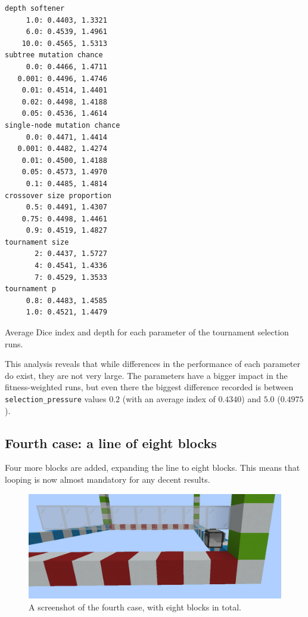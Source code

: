 \documentclass{report}
\newenvironment{code}{\captionsetup{type=listing}}{}
\begin{document}
\begin{code}
    \begin{verbatim}
depth softener
     1.0: 0.4403, 1.3321
     6.0: 0.4539, 1.4961
    10.0: 0.4565, 1.5313
subtree mutation chance
     0.0: 0.4466, 1.4711
   0.001: 0.4496, 1.4746
    0.01: 0.4514, 1.4401
    0.02: 0.4498, 1.4188
    0.05: 0.4536, 1.4614
single-node mutation chance
     0.0: 0.4471, 1.4414
   0.001: 0.4482, 1.4274
    0.01: 0.4500, 1.4188
    0.05: 0.4573, 1.4970
     0.1: 0.4485, 1.4814
crossover size proportion
     0.5: 0.4491, 1.4307
    0.75: 0.4498, 1.4461
     0.9: 0.4519, 1.4827
tournament size
       2: 0.4437, 1.5727
       4: 0.4541, 1.4336
       7: 0.4529, 1.3533
tournament p
     0.8: 0.4483, 1.4585
     1.0: 0.4521, 1.4479
    \end{verbatim}
    \caption{Average Dice index and depth for each parameter of the tournament selection runs.}
    \label{lst:case3_tour}
\end{code}

This analysis reveals that while differences in the performance of each parameter do exist, they are not very large. The parameters have a bigger impact in the fitness-weighted runs, but even there the biggest difference recorded is between \verb|selection_pressure| values $0.2$ (with an average index of $0.4340$) and $5.0$ ($0.4975$).

\subsection{Fourth case: a line of eight blocks}

Four more blocks are added, expanding the line to eight blocks. This means that looping is now almost mandatory for any decent results.

\begin{figure}[H]
    \centering
    \includegraphics[scale=0.3]{minecraft5}
    \caption{A screenshot of the fourth case, with eight blocks in total.}
\end{figure}
\end{document}
